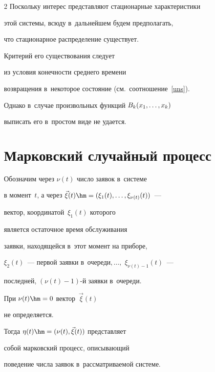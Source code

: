 \begin{multicols}{2}
Поскольку  интерес представляют стационарные характеристики


этой системы, всюду в~дальнейшем будем предполагать,


что стационарное распределение существует.


Критерий его существования следует


из условия конечности среднего времени


возвращения в~некоторое состояние (см.\ соотношение~\eqref{uns}).


Однако в~случае произвольных функций $B_k(x_1,\ldots,x_k)$


выписать его в~простом виде не удается.





\vspace*{-4pt}





\section{Марковский случайный процесс}





\vspace*{-2pt}





Обозначим через $\nu(t)$ число заявок в~системе


в момент~$t$, а через $\vec\xi(t)\hm=


(\xi_{1}(t),\ldots,\xi_{\nu(t)}(t))$~---


вектор, координатой~$\xi_{1}(t)$ которого


является остаточное время обслуживания


заявки, находящейся в~этот момент на приборе,


$\xi_{2}(t)$~--- первой заявки в~очереди$,\ldots,$ $\xi_{\nu(t)-1}(t)$~---


последней, \mbox{$(\nu(t)-1)$-й} заявки в~очереди.


При $\nu(t)\hm=0$ вектор~$\vec\xi(t)$


не определяется.


Тогда $\eta(t)\hm=(\nu(t),\vec\xi(t))$ представляет


собой марковский процесс, описывающий


поведение числа заявок в~рассматриваемой системе.






\end{multicols}
